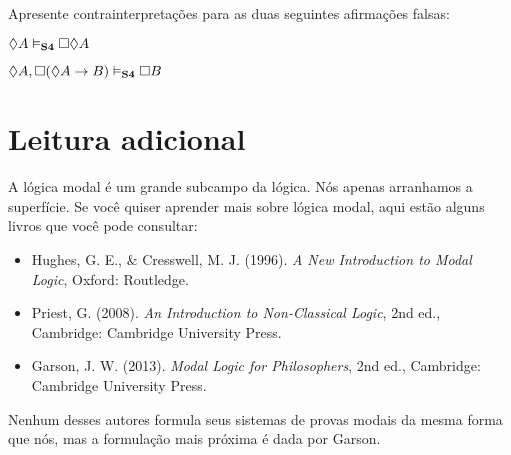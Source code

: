 \problempart
Apresente contrainterpretações para as duas seguintes afirmações falsas:
\begin{earg}
	\item $\Diamond A\vDash_{\mathbf{S4}} \Box\Diamond A$
	\item $\Diamond A, \Box (\Diamond A \rightarrow B)\vDash_{\mathbf{S4}}\Box B$
\end{earg}

\section*{Leitura adicional}

A lógica modal é um grande subcampo da lógica. Nós apenas arranhamos a superfície. Se você quiser aprender mais sobre lógica modal, aqui estão alguns livros que você pode consultar:

\begin{itemize}
	\item Hughes, G. E., \& Cresswell, M. J. (1996). \emph{A New Introduction to Modal Logic}, Oxford: Routledge.
	\item Priest, G. (2008). \emph{An Introduction to Non-Classical Logic}, 2nd ed., Cambridge: Cambridge University Press.
	\item Garson, J. W. (2013). \emph{Modal Logic for Philosophers}, 2nd ed., Cambridge: Cambridge University Press.
\end{itemize}

Nenhum desses autores formula seus sistemas de provas modais da mesma forma que nós, mas a formulação mais próxima é dada por Garson. 



